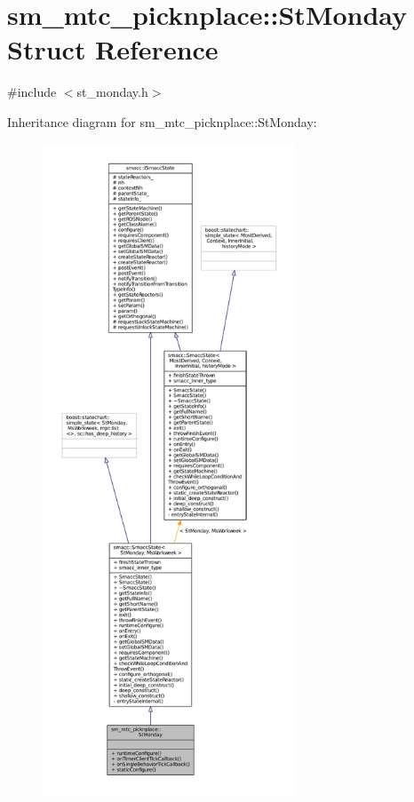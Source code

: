 \hypertarget{structsm__mtc__picknplace_1_1StMonday}{}\section{sm\+\_\+mtc\+\_\+picknplace\+:\+:St\+Monday Struct Reference}
\label{structsm__mtc__picknplace_1_1StMonday}


{\ttfamily \#include $<$st\+\_\+monday.\+h$>$}



Inheritance diagram for sm\+\_\+mtc\+\_\+picknplace\+:\+:St\+Monday\+:
\nopagebreak
\begin{figure}[H]
\begin{center}
\leavevmode
\includegraphics[height=550pt]{structsm__mtc__picknplace_1_1StMonday__inherit__graph}
\end{center}
\end{figure}


